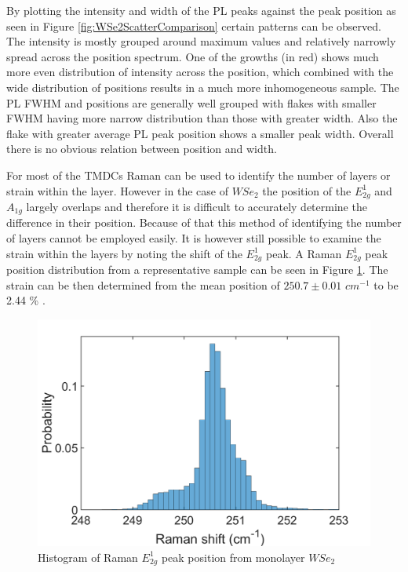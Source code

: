 By plotting the intensity and width of the PL peaks against the peak position as seen in Figure \ref{fig:WSe2ScatterComparison} certain patterns can be observed. The intensity is mostly grouped around maximum values and relatively narrowly spread across the position spectrum. One of the growths (in red) shows much more even distribution of intensity across the position, which combined with the wide distribution of positions results in a much more inhomogeneous sample. The PL FWHM and positions are generally well grouped with flakes with smaller FWHM having more narrow distribution than those with greater width. Also the flake with greater average PL peak position shows a smaller peak width. Overall there is no obvious relation between position and width.


For most of the TMDCs Raman can be used to identify the number of layers or strain within the layer. However in the case of $WSe_2$ the position of the $E^1_{2g}$ and $A_{1g}$ largely overlaps and therefore it is difficult to accurately determine the difference in their position. Because of that this method of identifying the number of layers cannot be employed easily. It is however still possible to examine the strain within the layers by noting the shift of the $E^1_{2g}$ peak. A Raman $E^1_{2g}$ peak position distribution from a representative sample can be seen in Figure \ref{fig:WSe2RamanPositionHistogram1}. The strain can be then determined from the mean position of $250.7 \pm 0.01$ $cm^{-1}$ to be 2.44 {\%} \cite{Dadgar2018}.

\begin{figure}[!h]
	\begin{center}
		\includegraphics[scale=0.3]{WSe2/WSe2RamanPositionHistogram1.png}
		\caption{Histogram of Raman $E^1_{2g}$ peak position from monolayer $WSe_2$}
		\label{fig:WSe2RamanPositionHistogram1}
	\end{center}
\end{figure}

